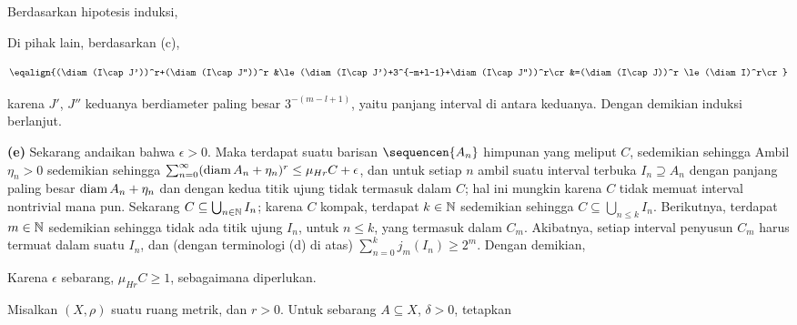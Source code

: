 {

\noindent Berdasarkan hipotesis induksi,


\noindent Di pihak lain, berdasarkan (c),

$$\eqalign{(\diam(I\cap J'))^r+(\diam(I\cap J''))^r
&\le(\diam(I\cap J')+3^{-m+l-1}+\diam(I\cap J''))^r\cr
&=(\diam(I\cap J))^r
\le(\diam I)^r\cr}$$

\noindent karena $J'$, $J''$ keduanya berdiameter paling besar
$3^{-(m-l+1)}$, yaitu panjang interval di antara keduanya.
Dengan demikian induksi berlanjut.\ \Qed

\medskip

{\bf (e)} Sekarang andaikan bahwa $\epsilon>0$. Maka terdapat suatu barisan
$\sequencen{A_n}$ himpunan yang meliput $C$, sedemikian sehingga
Ambil $\eta_n>0$ sedemikian sehingga
$\sum_{n=0}^{\infty}(\mathop{\text{diam}} A_n+\eta_n)^r\le\mu_{Hr}C+\epsilon$, dan untuk
setiap $n$ ambil suatu interval terbuka $I_n\supseteq A_n$ dengan panjang
paling besar $\mathop{\text{diam}} A_n+\eta_n$ dan dengan kedua titik ujung tidak termasuk
dalam $C$; hal ini mungkin karena $C$ tidak memuat interval nontrivial mana
pun. Sekarang $C\subseteq\bigcup_{n\in\Bbb N}I_n$; karena $C$ kompak,
terdapat $k\in\Bbb N$ sedemikian sehingga
$C\subseteq\bigcup_{n\le k}I_n$. Berikutnya, terdapat $m\in\Bbb N$ sedemikian
sehingga tidak ada titik ujung $I_n$, untuk $n\le k$, yang termasuk dalam
$C_m$. Akibatnya, setiap interval penyusun $C_m$ harus termuat dalam suatu
$I_n$, dan (dengan terminologi (d) di atas)
$\sum_{n=0}^kj_m(I_n)\ge 2^m$. Dengan demikian,


\noindent Karena $\epsilon$ sebarang, $\mu_{Hr}C\ge 1$, sebagaimana
diperlukan.
}%

 Misalkan $(X,\rho)$ suatu ruang metrik, dan $r>0$. Untuk sebarang
$A\subseteq X$, $\delta>0$, tetapkan

